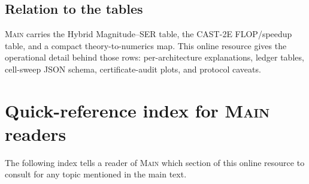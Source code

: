 \documentclass[11pt]{article}
\theoremstyle{plain}
\theoremstyle{definition}
\theoremstyle{remark}
\newcommand{\1}{\mathbf{1}}
\newcommand{\mainpaper}{\textsc{Main}}
\begin{document}
\subsection{Relation to the tables}

\mainpaper{} carries the Hybrid Magnitude--SER table, the CAST-2E FLOP/speedup table, and a compact theory-to-numerics map. This online resource gives the operational detail behind those rows: per-architecture explanations, ledger tables, cell-sweep JSON schema, certificate-audit plots, and protocol caveats.

\section{Quick-reference index for \mainpaper{} readers}
\label{sec:quick-index}

\noindent The following index tells a reader of \mainpaper{} which section of this online resource to consult for any topic mentioned in the main text.
\end{document}
